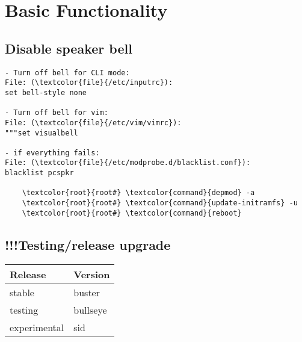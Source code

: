 \documentclass[10pt, a4paper, onecolumn, openany]{book} %
\begin{document}
\chapter{Basic Functionality}
\section{Disable speaker bell}
\begin{Verbatim}[commandchars=\\\{\}]
- Turn off bell for CLI mode:
File: (\textcolor{file}{/etc/inputrc}):
set bell-style none

- Turn off bell for vim:
File: (\textcolor{file}{/etc/vim/vimrc}):
"""set visualbell

- if everything fails:
File: (\textcolor{file}{/etc/modprobe.d/blacklist.conf}):
blacklist pcspkr

    \textcolor{root}{root#} \textcolor{command}{depmod} -a
    \textcolor{root}{root#} \textcolor{command}{update-initramfs} -u
    \textcolor{root}{root#} \textcolor{command}{reboot}
\end{Verbatim}


\section{!!!Testing/release upgrade}
\begin{center}
    \begin{small}
    \begin{tabular}{|p{4cm}|p{4cm}|}
    \hline
    \textbf{Release} & \textbf{Version} \\
    \hline
    stable & buster \\
    \hline
    testing & bullseye \\
    \hline
    experimental & sid \\
    \hline
    \end{tabular}
    \end{small}
\end{center}
\end{document}
